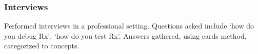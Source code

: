 \subsubsection{Interviews}
{\color{red}
Performed interviews in a professional setting. Questions asked include `how do you debug Rx', `how do you test Rx'. Answers gathered, using cards method, categorized to concepts.
}

%

%
%  
%  
%
%
%



